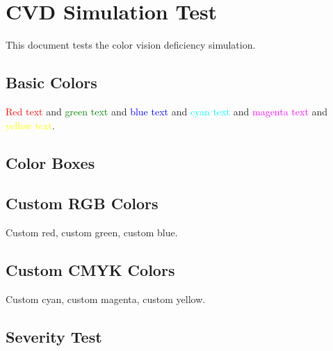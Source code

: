 \documentclass{article}
\begin{document}
\section{CVD Simulation Test}

This document tests the color vision deficiency simulation.

\subsection{Basic Colors}

\textcolor{red}{Red text} and \textcolor{green}{green text} and \textcolor{blue}{blue text} and \textcolor{cyan}{cyan text} and \textcolor{magenta}{magenta text} and \textcolor{yellow}{yellow text}.

\subsection{Color Boxes}


\subsection{Custom RGB Colors}


\textcolor{myred}{Custom red}, \textcolor{mygreen}{custom green}, \textcolor{myblue}{custom blue}.

\subsection{Custom CMYK Colors}


\textcolor{mycyan}{Custom cyan}, \textcolor{mymagenta}{custom magenta}, \textcolor{myyellow}{custom yellow}.

\subsection{Severity Test}
\end{document}
